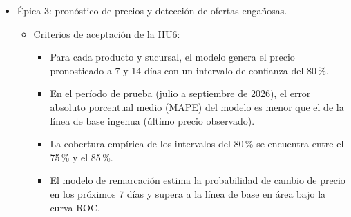 \documentclass[
11pt, %
]{charter}
\begin{document}
\begin{itemize}
\begin{itemize}
		\item Criterios de aceptación de la HU4:
		\begin{itemize}
			\item El 100\,\% de los productos con código EAN válido queda asociado a un producto canónico único, compartido entre cadenas.
			\item Para al menos el 95\,\% de los productos se obtiene el precio por kilogramo, litro o unidad a partir de la presentación informada, y los restantes quedan listados para revisión.
			\item Las marcas propias de un mismo elaborador quedan vinculadas mediante el RNPA.
			\item La normalización se verifica con pruebas automáticas sobre una muestra de 100 productos revisada manualmente, sin errores.
		\end{itemize}
		\item Criterios de aceptación de la HU5:
		\begin{itemize}
			\item Se construye un conjunto de al menos 500 pares de productos etiquetados manualmente como equivalentes o no equivalentes.
			\item Sobre un conjunto de prueba no utilizado en el entrenamiento, el clasificador de pares alcanza un F1 de al menos 0,80 y supera a un umbral simple de similitud coseno.
			\item Para cada producto, el sistema devuelve hasta cinco equivalentes ordenados por precio por unidad de medida, junto con su puntaje de similitud.
		\end{itemize}
	\end{itemize}
	\item Épica 3: pronóstico de precios y detección de ofertas engañosas.
	\begin{itemize}
		\item Criterios de aceptación de la HU6:
		\begin{itemize}
			\item Para cada producto y sucursal, el modelo genera el precio pronosticado a 7 y 14 días con un intervalo de confianza del 80\,\%.
			\item En el período de prueba (julio a septiembre de 2026), el error absoluto porcentual medio (MAPE) del modelo es menor que el de la línea de base ingenua (último precio observado).
			\item La cobertura empírica de los intervalos del 80\,\% se encuentra entre el 75\,\% y el 85\,\%.
			\item El modelo de remarcación estima la probabilidad de cambio de precio en los próximos 7 días y supera a la línea de base en área bajo la curva ROC.

\end{itemize}
\end{itemize}
\end{itemize}
\end{document}
